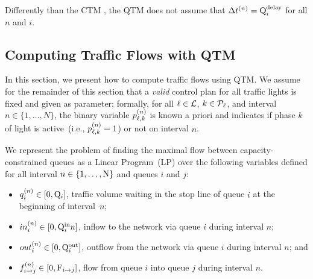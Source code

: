 Differently than the CTM \cite{daganzo1994cell,lin2004enhanced}, the QTM does
not assume that $\DT[n] = \QDELAY{i}$ for all $n$ and $i$.
%

%



\subsection{Computing Traffic Flows with QTM}

In this section, we present how to compute traffic flows using QTM.
%
We assume for the remainder of this section that a \emph{valid} control plan for
all traffic lights is fixed and given as parameter;
%
formally, for all $\tl \in \Lset$, $k \in \Pset_\tl$, and interval $n \in
\{1,\dots,N\}$, the binary variable $\p{\tl}{k}$ is known a priori and indicates
if phase $k$ of light \tl is active~(i.e., $\p{\tl}{k} = 1$) or not on interval
$n$.


We represent the problem of finding the maximal flow between
capacity-constrained queues as a Linear Program~(LP) over the following
variables defined for all interval $n \in \{1,\dots,\Nn\}$ and queues $i$ and
$j$:
%
\begin{itemize}
%
\item $\q{i} \in [0,\QMAX{i}]$, traffic volume waiting in the stop line of queue
  $i$ at the beginning of interval~$n$;
%
\item $\inq{i} \in [0,\QIN{i}{n}]$, inflow to the network via queue $i$ during
  interval $n$;
%
\item $\outq{i} \in [0,\QOUT{i}]$, outflow from the network via queue $i$ during
  interval $n$; and
%
\item $\f{i}{j} \in [0,\FMAX{i}{j}]$, flow from queue $i$ into queue $j$ during
  interval $n$.
%
\end{itemize}



